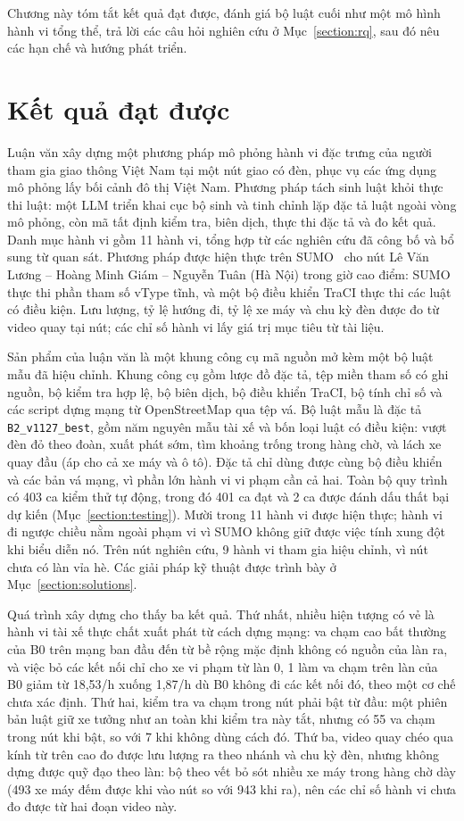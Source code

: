 \documentclass[../main.tex]{subfiles}
\begin{document}
Chương này tóm tắt kết quả đạt được, đánh giá bộ luật cuối như một mô hình hành vi tổng thể, trả lời các câu hỏi nghiên cứu ở Mục~\ref{section:rq}, sau đó nêu các hạn chế và hướng phát triển.

\section{Kết quả đạt được}

Luận văn xây dựng một phương pháp mô phỏng hành vi đặc trưng của người tham gia giao thông Việt Nam tại một nút giao có đèn, phục vụ các ứng dụng mô phỏng lấy bối cảnh đô thị Việt Nam. Phương pháp tách sinh luật khỏi thực thi luật: một LLM triển khai cục bộ sinh và tinh chỉnh lặp đặc tả luật ngoài vòng mô phỏng, còn mã tất định kiểm tra, biên dịch, thực thi đặc tả và đo kết quả. Danh mục hành vi gồm 11 hành vi, tổng hợp từ các nghiên cứu đã công bố và bổ sung từ quan sát. Phương pháp được hiện thực trên SUMO~\cite{lopez2018sumo} cho nút Lê Văn Lương -- Hoàng Minh Giám -- Nguyễn Tuân (Hà Nội) trong giờ cao điểm: SUMO thực thi phần tham số vType tĩnh, và một bộ điều khiển TraCI thực thi các luật có điều kiện. Lưu lượng, tỷ lệ hướng đi, tỷ lệ xe máy và chu kỳ đèn được đo từ video quay tại nút; các chỉ số hành vi lấy giá trị mục tiêu từ tài liệu.

Sản phẩm của luận văn là một khung công cụ mã nguồn mở kèm một bộ luật mẫu đã hiệu chỉnh. Khung công cụ gồm lược đồ đặc tả, tệp miền tham số có ghi nguồn, bộ kiểm tra hợp lệ, bộ biên dịch, bộ điều khiển TraCI, bộ tính chỉ số và các script dựng mạng từ OpenStreetMap qua tệp vá. Bộ luật mẫu là đặc tả \texttt{B2\_v1127\_best}, gồm năm nguyên mẫu tài xế và bốn loại luật có điều kiện: vượt đèn đỏ theo đoàn, xuất phát sớm, tìm khoảng trống trong hàng chờ, và lách xe quay đầu (áp cho cả xe máy và ô tô). Đặc tả chỉ dùng được cùng bộ điều khiển và các bản vá mạng, vì phần lớn hành vi vi phạm cần cả hai. Toàn bộ quy trình có 403 ca kiểm thử tự động, trong đó 401 ca đạt và 2 ca được đánh dấu thất bại dự kiến (Mục~\ref{section:testing}). Mười trong 11 hành vi được hiện thực; hành vi đi ngược chiều nằm ngoài phạm vi vì SUMO không giữ được việc tính xung đột khi biểu diễn nó. Trên nút nghiên cứu, 9 hành vi tham gia hiệu chỉnh, vì nút chưa có làn vỉa hè. Các giải pháp kỹ thuật được trình bày ở Mục~\ref{section:solutions}.

Quá trình xây dựng cho thấy ba kết quả. Thứ nhất, nhiều hiện tượng có vẻ là hành vi tài xế thực chất xuất phát từ cách dựng mạng: va chạm cao bất thường của B0 trên mạng ban đầu đến từ bề rộng mặc định không có nguồn của làn ra, và việc bỏ các kết nối chỉ cho xe vi phạm từ làn 0, 1 làm va chạm trên làn của B0 giảm từ 18,53/h xuống 1,87/h dù B0 không đi các kết nối đó, theo một cơ chế chưa xác định. Thứ hai, kiểm tra va chạm trong nút phải bật từ đầu: một phiên bản luật giữ xe tưởng như an toàn khi kiểm tra này tắt, nhưng có 55 va chạm trong nút khi bật, so với 7 khi không dùng cách đó. Thứ ba, video quay chéo qua kính từ trên cao đo được lưu lượng ra theo nhánh và chu kỳ đèn, nhưng không dựng được quỹ đạo theo làn: bộ theo vết bỏ sót nhiều xe máy trong hàng chờ dày (493 xe máy đếm được khi vào nút so với 943 khi ra), nên các chỉ số hành vi chưa đo được từ hai đoạn video này.
\end{document}
